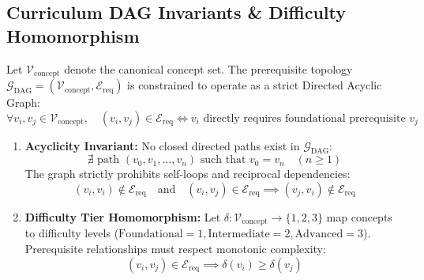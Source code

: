 \documentclass[10pt,a4paper]{article}
\begin{document}
\subsection{Curriculum DAG Invariants \& Difficulty Homomorphism}
Let $\mathcal{V}_{\text{concept}}$ denote the canonical concept set. The prerequisite topology $\mathcal{G}_{\text{DAG}} = (\mathcal{V}_{\text{concept}}, \mathcal{E}_{\text{req}})$ is constrained to operate as a strict Directed Acyclic Graph:
\begin{equation}
\forall v_i, v_j \in \mathcal{V}_{\text{concept}}, \quad (v_i, v_j) \in \mathcal{E}_{\text{req}} \iff v_i \text{ directly requires foundational prerequisite } v_j
\end{equation}
\begin{enumerate}\setlength{\itemsep}{1pt}\setlength{\parskip}{0pt}
\item \textbf{Acyclicity Invariant:} No closed directed paths exist in $\mathcal{G}_{\text{DAG}}$:
\begin{equation}
\nexists \text{ path } (v_0, v_1, \dots, v_n) \text{ such that } v_0 = v_n \quad (n \ge 1)
\end{equation}
The graph strictly prohibits self-loops and reciprocal dependencies:
\begin{equation}
(v_i, v_i) \notin \mathcal{E}_{\text{req}} \quad \text{and} \quad (v_i, v_j) \in \mathcal{E}_{\text{req}} \implies (v_j, v_i) \notin \mathcal{E}_{\text{req}}
\end{equation}
\item \textbf{Difficulty Tier Homomorphism:} Let $\delta: \mathcal{V}_{\text{concept}} \to \{1, 2, 3\}$ map concepts to difficulty levels ($\text{Foundational}=1, \text{Intermediate}=2, \text{Advanced}=3$). Prerequisite relationships must respect monotonic complexity:
\begin{equation}
(v_i, v_j) \in \mathcal{E}_{\text{req}} \implies \delta(v_i) \ge \delta(v_j)
\end{equation}
\end{enumerate}

\end{document}
